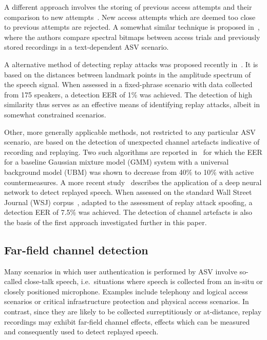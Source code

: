 A different approach involves the storing of previous access attempts and their comparison to new attempts~\cite{Shang2010}.
New access attempts which are deemed too close to previous attempts are rejected.
A somewhat similar technique is proposed in~\cite{Wu2014}, where the authors compare spectral bitmaps between access trials and previously stored recordings in a text-dependent ASV scenario. 

A alternative method of detecting replay attacks was proposed recently in~\cite{Galka2015}.  It is based on the distances between landmark points in the amplitude spectrum of the speech signal.  When assessed in a fixed-phrase scenario with data collected from 175 speakers, a detection EER of 1\% was achieved.  The detection of high similarity thus serves as an effective means of identifying replay attacks, albeit in somewhat constrained scenarios.

Other, more generally applicable methods, not restricted to any particular ASV scenario, are based on the detection of unexpected channel artefacts indicative of recording and replaying.
Two such algorithms are reported in~\cite{Wang2011} for which the EER for a baseline Gaussian mixture model (GMM) system with a universal background model (UBM) was shown to decrease from 40\% to 10\% with active countermeasures.  A more recent study~\cite{Luo2015} describes the application of a deep neural network to detect replayed speech.  
When assessed on the standard Wall Street Journal (WSJ) corpus~\cite{WSJ1993}, adapted to the assessment of replay attack spoofing, a detection EER of 7.5\% was achieved.  The detection of channel artefacts is also the basis of the first approach investigated further in this paper.




\subsection{Far-field channel detection}
\label{subsec:ffd}

Many scenarios in which user authentication is performed by ASV involve so-called close-talk speech, i.e.\ situations where speech is collected from an in-situ or closely positioned microphone.  Examples include telephony and logical access scenarios or critical infrastructure protection and physical access scenarios.  In contrast, since they are likely to be collected surreptitiously or at-distance, replay recordings may exhibit far-field channel effects, effects which can be measured and consequently used to detect replayed speech.  

